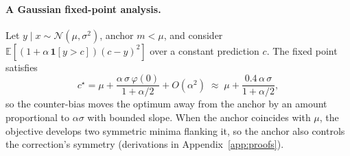 \paragraph{A Gaussian fixed-point analysis.}

Let $y \mid x \sim \mathcal{N}(\mu, \sigma^2)$, anchor $m < \mu$, and consider $\mathbb{E}[(1 + \alpha\,\mathbf{1}[y > c])(c - y)^2]$ over a constant prediction $c$. The fixed point satisfies
\begin{equation}
    c^\star = \mu + \frac{\alpha\,\sigma\,\varphi(0)}{1 + \alpha / 2} + O(\alpha^2) \;\approx\; \mu + \frac{0.4\,\alpha\,\sigma}{1 + \alpha/2},
    \label{eq:fixedpoint}
\end{equation}
so the counter-bias moves the optimum away from the anchor by an amount proportional to $\alpha\sigma$ with bounded slope. When the anchor coincides with $\mu$, the objective develops two symmetric minima flanking it, so the anchor also controls the correction's symmetry (derivations in Appendix~\ref{app:proofs}).
